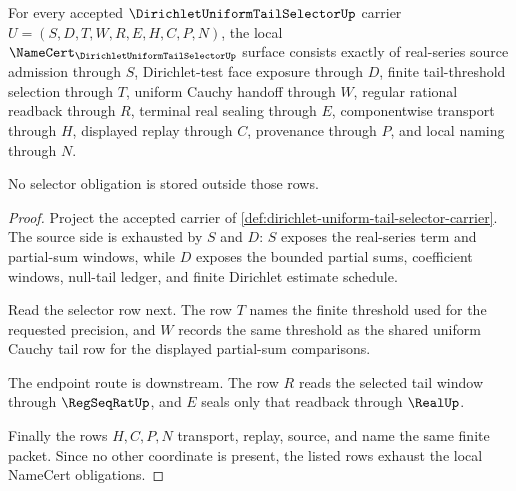 \begin{theorem}
\label{thm:dirichlet-uniform-tail-selector-namecert-obligations}
For every accepted $\DirichletUniformTailSelectorUp$ carrier $U=(S,D,T,W,R,E,H,C,P,N)$, the local $\NameCert_{\DirichletUniformTailSelectorUp}$ surface consists exactly of real-series source admission through $S$, Dirichlet-test face exposure through $D$, finite tail-threshold selection through $T$, uniform Cauchy handoff through $W$, regular rational readback through $R$, terminal real sealing through $E$, componentwise transport through $H$, displayed replay through $C$, provenance through $P$, and local naming through $N$.

No selector obligation is stored outside those rows.
\end{theorem}
\begin{proof}
Project the accepted carrier of \autoref{def:dirichlet-uniform-tail-selector-carrier}. The source side is exhausted by $S$ and $D$: $S$ exposes the real-series term and partial-sum windows, while $D$ exposes the bounded partial sums, coefficient windows, null-tail ledger, and finite Dirichlet estimate schedule.

Read the selector row next. The row $T$ names the finite threshold used for the requested precision, and $W$ records the same threshold as the shared uniform Cauchy tail row for the displayed partial-sum comparisons.

The endpoint route is downstream. The row $R$ reads the selected tail window through $\RegSeqRatUp$, and $E$ seals only that readback through $\RealUp$.

Finally the rows $H,C,P,N$ transport, replay, source, and name the same finite packet. Since no other coordinate is present, the listed rows exhaust the local NameCert obligations.
\end{proof}

